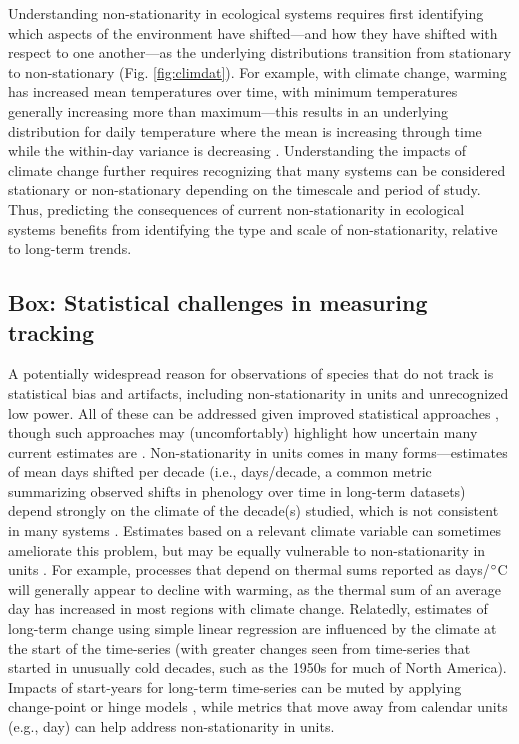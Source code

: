 \documentclass[11pt,letterpaper]{article}
\begin{document}
Understanding non-stationarity in ecological systems requires first identifying which aspects of the environment have shifted---and how they have shifted with respect to one another---as the underlying  distributions transition from stationary to non-stationary (Fig. \ref{fig:climdat}). For example, with climate change, warming has increased mean temperatures over time, with minimum temperatures generally increasing more than maximum---this results in an underlying distribution for daily temperature where the mean is increasing through time while the within-day variance is decreasing \citep{ipcc2013,screen2014}. Understanding the impacts of climate change further requires recognizing that many systems can be considered stationary or non-stationary depending on the timescale and period of study. Thus, predicting the consequences of current non-stationarity in ecological systems benefits from identifying the type and scale of non-stationarity, relative to long-term trends. 

\subsection{Box: Statistical challenges in measuring tracking} %
A potentially widespread reason for observations of species that do not track is statistical bias and artifacts, including non-stationarity in units and unrecognized low power. All of these can be addressed given improved statistical approaches \citep[e.g.,][]{gienapp2005,pearse2017}, though such approaches may (uncomfortably) highlight how uncertain many current estimates are \citep{brown2016}. Non-stationarity in units comes in many forms---estimates of mean days shifted per decade (i.e., days/decade, a common metric summarizing observed shifts in phenology over time in long-term datasets) depend strongly on the climate of the decade(s) studied, which is not consistent in many systems \citep{Ault2011,McCabe2012}. Estimates based on a relevant climate variable can sometimes ameliorate this problem, but may be equally vulnerable to non-stationarity in units \citep[e.g.,][]{Sagarin:2001fu}. For example, processes that depend on thermal sums reported as days/$\degree$C will generally appear to decline with warming, as the thermal sum of an average day has increased in most regions with climate change. Relatedly, estimates of long-term change using simple linear regression are influenced by the climate at the start of the time-series (with greater changes seen from time-series that started in unusually cold decades, such as the 1950s for much of North America). Impacts of start-years for long-term time-series can be muted by applying change-point or hinge models \citep[e.g.,][]{kharouba2018}, while metrics that move away from calendar units (e.g., day) can help address non-stationarity in units. 
\end{document}
